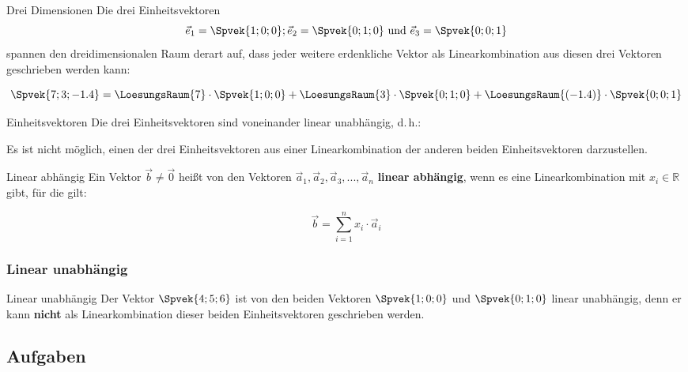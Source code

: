 \begin{bemerkung}{Drei Dimensionen}{}
  Die drei Einheitsvektoren
  $$\vec{e}_1=\Spvek{1;0;0} ;
  \vec{e}_2=\Spvek{0;1;0} \text{ und }
  \vec{e}_3=\Spvek{0;0;1}$$
spannen den dreidimensionalen Raum derart auf, dass jeder weitere
erdenkliche Vektor als
Linearkombination aus diesen drei Vektoren geschrieben werden kann:

$$\Spvek{7;3;-1.4} = 
  \LoesungsRaum{  7   }\cdot{}\Spvek{1;0;0} + 
  \LoesungsRaum{  3   }\cdot{}\Spvek{0;1;0} +
  \LoesungsRaum{(-1.4)}\cdot{}\Spvek{0;0;1}$$
\end{bemerkung}

\begin{gesetz}{Einheitsvektoren}{}
  Die drei Einheitsvektoren sind voneinander linear unabhängig, d.\,h.:

  Es ist nicht möglich, einen der drei Einheitsvektoren aus einer
  Linearkombination der anderen beiden Einheitsvektoren darzustellen.
\end{gesetz}

\begin{definition}{Linear abhängig}{}
  Ein Vektor $\vec{b}\ne \vec{0}$ heißt von den Vektoren $\vec{a}_1, \vec{a}_2,
  \vec{a}_3, ... , \vec{a}_n$ \textbf{linear abhängig}, wenn es eine
  Linearkombination mit $x_i \in \mathbb{R}$ gibt, für die gilt:

  $$\vec{b} = \sum_{i=1}^{n}x_i\cdot{}\vec{a}_i$$
  \end{definition}
\newpage
\subsubsection{Linear unabhängig}
\begin{bemerkung}{Linear unabhängig}{}
  Der Vektor $\Spvek{4;5;6}$ ist von den beiden
    Vektoren $\Spvek{1;0;0}$
    und $\Spvek{0;1;0}$  linear unabhängig, denn
      er kann \textbf{nicht} als Linearkombination dieser beiden
      Einheitsvektoren geschrieben werden.
\end{bemerkung}

\subsection*{Aufgaben}

